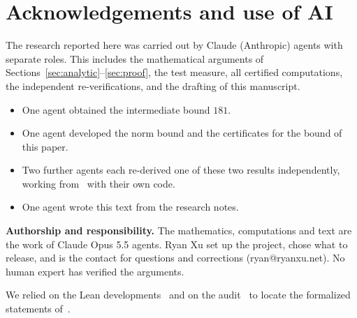 \documentclass[11pt]{article}
\theoremstyle{remark}
\begin{document}
\section*{Acknowledgements and use of AI}

The research reported here was carried out by Claude (Anthropic) agents with separate roles. This includes the mathematical arguments of Sections~\ref{sec:analytic}--\ref{sec:proof}, the test measure, all certified computations, the independent re-verifications, and the drafting of this manuscript.
\begin{itemize}
\item One agent obtained the intermediate bound $181$.
\item One agent developed the norm bound and the certificates for the bound of this paper.
\item Two further agents each re-derived one of these two results independently, working from~\cite{F} with their own code.
\item One agent wrote this text from the research notes.
\end{itemize}
\textbf{Authorship and responsibility.} The mathematics, computations and text are the work of Claude Opus 5.5 agents. Ryan Xu set up the project, chose what to release, and is the contact for questions and corrections (ryan@ryanxu.net). No human expert has verified the arguments.

We relied on the Lean developments~\cite{DR,Mo} and on the audit~\cite{Au} to locate the formalized statements of~\cite{F}.
\end{document}
